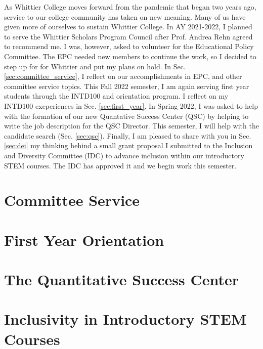 \documentclass[../../main.tex]{subfiles}
\begin{document}
\label{sec:service}

As Whittier College moves forward from the pandemic that began two years ago, service to our college community has taken on new meaning.  Many of us have given more of ourselves to sustain Whittier College.  In AY 2021-2022, I planned to serve the Whittier Scholars Program Council after Prof. Andrea Rehn agreed to recommend me.  I was, however, asked to volunteer for the Educational Policy Committee.  The EPC needed new members to continue the work, so I decided to step up for for Whittier and put my plans on hold.  In Sec. \ref{sec:committee_service}, I reflect on our accomplishments in EPC, and other committee service topics.  This Fall 2022 semester, I am again serving first year students through the INTD100 and orientation program.  I reflect on my INTD100 exeperiences in Sec. \ref{sec:first_year}.  In Spring 2022, I was asked to help with the formation of our new Quantative Success Center (QSC) by helping to write the job description for the QSC Director.  This semester, I will help with the candidate search (Sec. \ref{sec:qsc}).  Finally, I am pleased to share with you in Sec. \ref{sec:dei} my thinking behind a small grant proposal I submitted to the Inclusion and Diversity Committee (IDC) to advance inclusion within our introductory STEM courses.  The IDC has approved it and we begin work this semester.

\section{Committee Service}

\begin{flushleft}

\end{flushleft}

\section{First Year Orientation}

\begin{flushleft}

\end{flushleft}

\section{The Quantitative Success Center}

\begin{flushleft}

\end{flushleft}

\section{Inclusivity in Introductory STEM Courses}

\begin{flushleft}

\end{flushleft}
\end{document}
